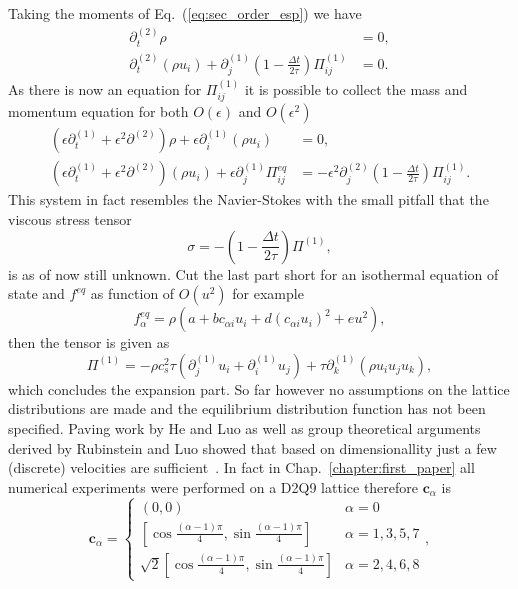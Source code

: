 Taking the moments of Eq.~(\ref{eq:sec_order_esp}) we have
\begin{align}
    \partial_t^{(2)}\rho &= 0, \\
    \partial_t^{(2)}(\rho u_i) + \partial^{(1)}_j\left(1 - \frac{\Delta t}{2\tau}\right)\Pi_{i j}^{(1)} &= 0.
\end{align}
As there is now an equation for $\Pi^{(1)}_{i j}$ it is possible to collect the mass and momentum equation for both $O(\epsilon)$ and $O(\epsilon^2)$
\begin{align}
    (\epsilon\partial_t^{(1)} + \epsilon^2\partial^{(2)})\rho + \epsilon\partial_i^{(1)}(\rho u_i) &= 0, \\
    (\epsilon\partial_t^{(1)} + \epsilon^2\partial^{(2)})(\rho u_i) + \epsilon\partial_j^{(1)}\Pi^{eq}_{i j} &= -\epsilon^2\partial_j^{(2)}\left(1 - \frac{\Delta t}{2\tau}\right) \Pi^{(1)}_{i j}. 
\end{align}
This system in fact resembles the Navier-Stokes with the small pitfall that the viscous stress tensor
\begin{equation}
    \sigma = - \left(1 - \frac{\Delta t}{2\tau}\right) \Pi^{(1)},
\end{equation}
is as of now still unknown.
Cut the last part short for an isothermal equation of state and $f^{eq}$ as function of $O(u^2)$ for example
\begin{equation}\label{eq:eqi_dist1}
    f_{\alpha}^{eq} = \rho(a + b c_{\alpha i} u_i + d (c_{\alpha i} u_i)^2 + e u^2),
\end{equation}
then the tensor is given as
\begin{equation}
    \Pi^{(1)} = -\rho c_s^2\tau(\partial_j^{(1)}u_i + \partial_i^{(1)}u_j) + \tau\partial_k^{(1)}(\rho u_i u_j u_k),
\end{equation}
which concludes the expansion part.
So far however no assumptions on the lattice distributions are made and the equilibrium distribution function has not been specified.
Paving work by He and Luo as well as group theoretical arguments derived by Rubinstein and Luo showed that based on dimensionallity just a few (discrete) velocities are sufficient~\cite{heTheoryLatticeBoltzmann1997, rubinstein2008theory}.
In fact in Chap.~\ref{chapter:first_paper} all numerical experiments were performed on a D2Q9 lattice therefore $\mathbf{c}_{\alpha}$ is
\begin{equation}\label{eq:speeds_method}
\mathbf{c}_{\alpha}  =
\left\{
\begin{array}{ll}
(0,0) & \alpha = 0 \\
\left[\cos{\frac{(\alpha-1)\pi}{4}}, \sin{\frac{(\alpha-1)\pi}{4}} \right] &  \alpha=1,3,5,7 \\
\sqrt{2}\left[\cos{\frac{(\alpha-1)\pi}{4}}, \sin{\frac{(\alpha-1)\pi}{4}} \right] & \alpha=2,4,6,8
\end{array}
\right.,
\end{equation}
